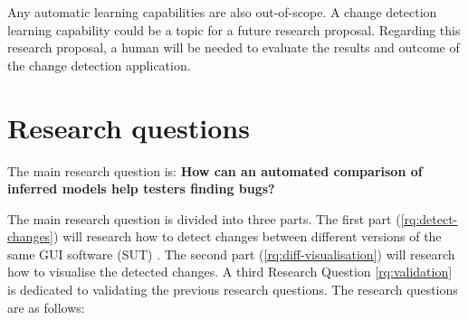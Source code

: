 Any automatic learning capabilities are also out-of-scope. A change detection learning capability could be a topic for a future research proposal. Regarding this research proposal, a human will be needed to evaluate the results and outcome of the change detection application.

\section{Research questions} \label{research-questions}
        
The main research question is: \textbf{How can an automated comparison of inferred models help testers finding bugs?}

The main research question is divided into three parts. The first part (\ref{rq:detect-changes}) will research how to detect changes between different versions of the same GUI software (SUT) \cite{testar-todo}. The second part (\ref{rq:diff-visualisation}) will research how to visualise the detected changes. A third Research Question \ref{rq:validation} is dedicated to validating the previous research questions. The research questions are as follows: 



